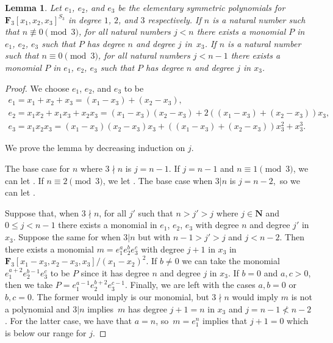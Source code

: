 \documentclass[11pt]{article}
\numberwithin{equation}{section}
\newtheorem{Lemma}[Theorem]{Lemma}
\theoremstyle{definition}
\numberwithin{equation}{section}
\begin{document}
\begin{Lemma}\label{monAll}
 Let $e_1$, $e_2$, and $e_3$ be the elementary symmetric polynomials for $\mathbf{F}_3[x_1,x_2,x_3]^{S_3}$ in degree $1$, $2$, and $3$ respectively. If $n$ is a natural number such that $n\not\equiv 0\pmod{3}$, for all natural numbers $j<n$ there exists a monomial $P$ in $e_1$, $e_2$, $e_3$ such that $P$ has degree $n$ and degree $j$ in~$x_3$. If $n$ is a natural number such that $n\equiv 0 \pmod{3}$, for all natural numbers $j<n-1$ there exists a monomial $P$ in $e_1$, $e_2$, $e_3$ such that $P$ has degree $n$ and degree $j$ in $x_3$.
\end{Lemma}
\begin{proof}
 We choose $e_1$, $e_2$, and $e_3$ to be
 \begin{gather*}
 e_1=x_1+x_2+x_3=(x_1-x_3)+(x_2-x_3),\\
 e_2=x_1x_2+x_1x_3+x_2x_3=(x_1-x_3)(x_2-x_3)+2((x_1-x_3)+(x_2-x_3))x_3,\\
 e_3=x_1x_2x_3=(x_1-x_3)(x_2-x_3)x_3+((x_1-x_3)+(x_2-x_3))x_3^2 + x_3^3.
 \end{gather*}

 We prove the lemma by decreasing induction on $j$.

 The base case for $n$ where $3\nmid n$ is $j=n-1$. If $j=n-1$ and $n\equiv 1 \pmod{3}$, we can let . If $n\equiv 2 \pmod{3}$, we let . The base case when $3|n$ is $j=n-2$,~so we can let .

 Suppose that, when $3\nmid n$, for all $j'$ such that $n>j'>j$ where $j\in \mathbf{N}$ and $0\leq j<n-1$ there exists a monomial in $e_1$, $e_2$, $e_3$ with degree $n$ and degree $j'$ in $x_3$. Suppose the same for when $3|n$ but with $n-1>j'>j$ and $j<n-2$. Then there exists a monomial $m=e_1^ae_2^be_3^c$ with degree $j+1$ in $x_3$ in $\mathbf{F}_3[x_1-x_3,x_2-x_3,x_3]/(x_1-x_2)^2$. If $b\neq 0$ we can take the monomial $e_1^{a+2}e_2^{b-1}e_3^{c}$ to be $P$ since it has degree $n$ and degree $j$ in $x_3$. If $b=0$ and $a,c>0$, then we take $P=e_1^{a-1}e_2^{b+2}e_3^{c-1}$. Finally, we are left with the cases $a,b=0$ or $b,c=0$. The former would imply  is our monomial, but $3\nmid n$ would imply $m$ is not a polynomial and $3|n$ implies~$m$ has degree $j+1=n$ in $x_3$ and $j=n-1\not < n-2$. For the latter case, we have that $a=n$, so~${m=e_1^{n}}$ implies that $j+1=0$ which is below our range for $j$.
\end{proof}
\end{document}
